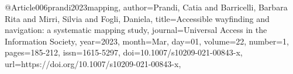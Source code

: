 @Article{006prandi2023mapping,
author={Prandi, Catia and Barricelli, Barbara Rita and Mirri, Silvia and Fogli, Daniela},
title={Accessible wayfinding and navigation: a systematic mapping study},
journal={Universal Access in the Information Society},
year={2023},
month={Mar},
day={01},
volume={22},
number={1},
pages={185-212},
issn={1615-5297},
doi={10.1007/s10209-021-00843-x},
url={https://doi.org/10.1007/s10209-021-00843-x},
}
